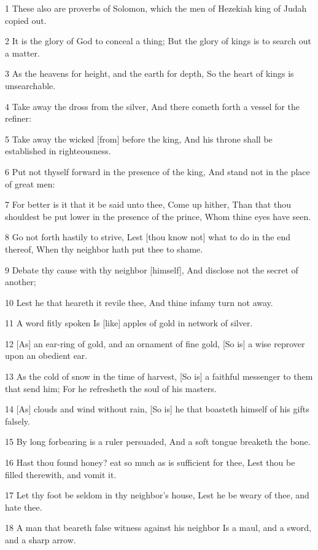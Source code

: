 \par 1 These also are proverbs of Solomon, which the men of Hezekiah king of Judah copied out.
\par 2 It is the glory of God to conceal a thing; But the glory of kings is to search out a matter.
\par 3 As the heavens for height, and the earth for depth, So the heart of kings is unsearchable.
\par 4 Take away the dross from the silver, And there cometh forth a vessel for the refiner:
\par 5 Take away the wicked [from] before the king, And his throne shall be established in righteousness.
\par 6 Put not thyself forward in the presence of the king, And stand not in the place of great men:
\par 7 For better is it that it be said unto thee, Come up hither, Than that thou shouldest be put lower in the presence of the prince, Whom thine eyes have seen.
\par 8 Go not forth hastily to strive, Lest [thou know not] what to do in the end thereof, When thy neighbor hath put thee to shame.
\par 9 Debate thy cause with thy neighbor [himself], And disclose not the secret of another;
\par 10 Lest he that heareth it revile thee, And thine infamy turn not away.
\par 11 A word fitly spoken Is [like] apples of gold in network of silver.
\par 12 [As] an ear-ring of gold, and an ornament of fine gold, [So is] a wise reprover upon an obedient ear.
\par 13 As the cold of snow in the time of harvest, [So is] a faithful messenger to them that send him; For he refresheth the soul of his masters.
\par 14 [As] clouds and wind without rain, [So is] he that boasteth himself of his gifts falsely.
\par 15 By long forbearing is a ruler persuaded, And a soft tongue breaketh the bone.
\par 16 Hast thou found honey? eat so much as is sufficient for thee, Lest thou be filled therewith, and vomit it.
\par 17 Let thy foot be seldom in thy neighbor's house, Lest he be weary of thee, and hate thee.
\par 18 A man that beareth false witness against his neighbor Is a maul, and a sword, and a sharp arrow.

